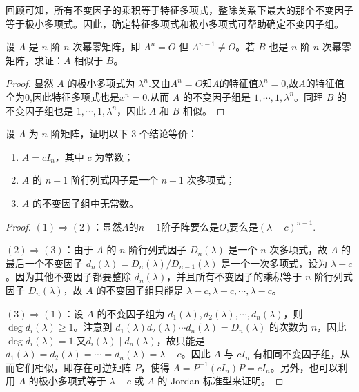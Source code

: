 \documentclass[../../main.tex]{subfiles}%
\begin{document}
回顾可知，所有不变因子的乘积等于特征多项式，整除关系下最大的那个不变因子等于极小多项式。因此，确定特征多项式和极小多项式可帮助确定不变因子组。

\begin{proposition}[同阶幂零阵必相似]\label{proposition:同阶幂零阵必相似}
设 \(A\) 是 \(n\) 阶 \(n\) 次幂零矩阵，即 \(A^n = O\) 但 \(A^{n - 1}\neq O\)。若 \(B\) 也是 \(n\) 阶 \(n\) 次幂零矩阵，求证：\(A\) 相似于 \(B\)。
\end{proposition}
\begin{proof}

显然 \(A\) 的极小多项式为 \(\lambda^n\).又由$A^n=O$知$A$的特征值$\lambda^n=0$,故$A$的特征值全为0,因此特征多项式也是$x^n=0$.从而 \(A\) 的不变因子组是 \(1,\cdots,1,\lambda^n\)。同理 \(B\) 的不变因子组也是 \(1,\cdots,1,\lambda^n\)，因此 \(A\) 和 \(B\) 相似。

\end{proof}

\begin{proposition}\label{proposition:纯量阵关于不变因子和行列式因子的等价条件}
设 \(A\) 为 \(n\) 阶矩阵，证明以下 3 个结论等价：
\begin{enumerate}[(1)]
\item  \(A = cI_n\)，其中 \(c\) 为常数；

\item  \(A\) 的 \(n - 1\) 阶行列式因子是一个 \(n - 1\) 次多项式；

\item \(A\) 的不变因子组中无常数。
\end{enumerate}
\end{proposition}
\begin{proof}

\((1)\Rightarrow(2)\)：显然$A$的$n-1$阶子阵要么是$O$,要么是$(\lambda-c)^{n-1}$.

\((2)\Rightarrow(3)\)：由于 \(A\) 的 \(n\) 阶行列式因子 \(D_n(\lambda)\) 是一个 \(n\) 次多项式，故 \(A\) 的最后一个不变因子 \(d_n(\lambda)=D_n(\lambda)/D_{n - 1}(\lambda)\) 是一个一次多项式，设为 \(\lambda - c\)。因为其他不变因子都要整除 \(d_n(\lambda)\)，并且所有不变因子的乘积等于 \(n\) 阶行列式因子 \(D_n(\lambda)\)，故 \(A\) 的不变因子组只能是 \(\lambda - c,\lambda - c,\cdots,\lambda - c\)。 

\((3)\Rightarrow(1)\)：设 \(A\) 的不变因子组为 \(d_1(\lambda),d_2(\lambda),\cdots,d_n(\lambda)\)，则 \(\deg d_i(\lambda)\geqslant 1\)。注意到 \(d_1(\lambda)d_2(\lambda)\cdots d_n(\lambda)=D_n(\lambda)\) 的次数为 \(n\)，因此$\deg d_i(\lambda)=1$.又\(d_i(\lambda)\mid d_n(\lambda)\)，故只能是 \(d_1(\lambda)=d_2(\lambda)=\cdots=d_n(\lambda)=\lambda - c\)。因此 \(A\) 与 \(cI_n\) 有相同不变因子组，从而它们相似，即存在可逆矩阵 \(P\)，使得 \(A = P^{-1}(cI_n)P = cI_n\)。另外，也可以利用 \(A\) 的极小多项式等于 \(\lambda - c\) 或 \(A\) 的 Jordan 标准型来证明。

\end{proof}
\end{document}
